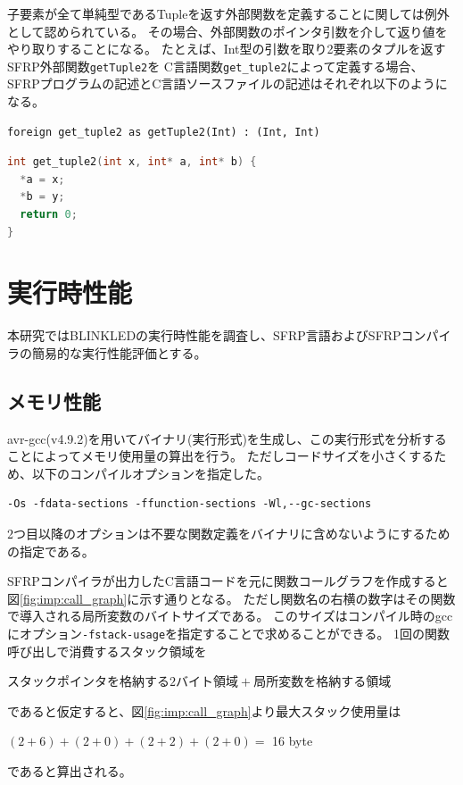 子要素が全て単純型であるTupleを返す外部関数を定義することに関しては例外として認められている。
その場合、外部関数のポインタ引数を介して返り値をやり取りすることになる。
たとえば、Int型の引数を取り2要素のタプルを返すSFRP外部関数\texttt{getTuple2}を
C言語関数\texttt{get\_tuple2}によって定義する場合、
SFRPプログラムの記述とC言語ソースファイルの記述はそれぞれ以下のようになる。
\begin{lstlisting}[basicstyle=\ttfamily\small,language=SFRP]
foreign get_tuple2 as getTuple2(Int) : (Int, Int)
\end{lstlisting}
\begin{lstlisting}[basicstyle=\ttfamily\small,language=C]
int get_tuple2(int x, int* a, int* b) {
  *a = x;
  *b = y;
  return 0;
}
\end{lstlisting}


\section{実行時性能}\label{sec:implementation:performance}
本研究ではBLINKLEDの実行時性能を調査し、SFRP言語およびSFRPコンパイラの簡易的な実行性能評価とする。

\subsection{メモリ性能}
avr-gcc(v4.9.2)を用いてバイナリ(実行形式)を生成し、この実行形式を分析することによってメモリ使用量の算出を行う。
ただしコードサイズを小さくするため、以下のコンパイルオプションを指定した。
\begin{lstlisting}[basicstyle=\ttfamily\small,numbers=none,frame=none]
-Os -fdata-sections -ffunction-sections -Wl,--gc-sections
\end{lstlisting}
2つ目以降のオプションは不要な関数定義をバイナリに含めないようにするための指定である。

SFRPコンパイラが出力したC言語コードを元に関数コールグラフを作成すると図\ref{fig:imp:call_graph}に示す通りとなる。
ただし関数名の右横の数字はその関数で導入される局所変数のバイトサイズである。
このサイズはコンパイル時のgccにオプション\texttt{-fstack-usage}を指定することで求めることができる。
1回の関数呼び出しで消費するスタック領域を
\begin{center}
$スタックポインタを格納する2バイト領域 + 局所変数を格納する領域$
\end{center}
であると仮定すると、図\ref{fig:imp:call_graph}より最大スタック使用量は
\begin{center}
$(2 + 6) + (2 + 0) + (2 + 2) + (2 + 0) =$ 16 byte\\
\end{center}
であると算出される。

